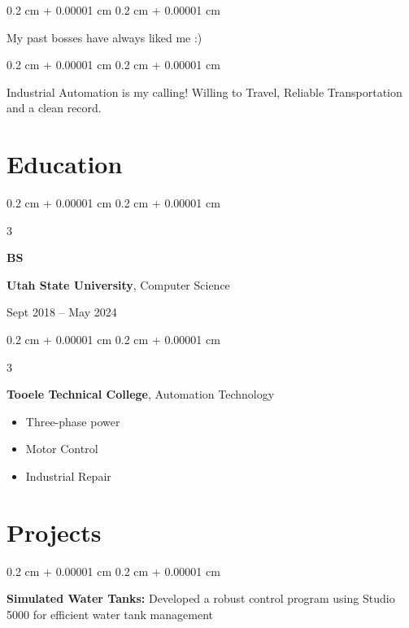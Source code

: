 \documentclass[10pt, letterpaper]{article}
\newenvironment{highlights}{
    \begin{itemize}[
        topsep=0.10 cm,
        parsep=0.10 cm,
        partopsep=0pt,
        itemsep=0pt,
        leftmargin=0.4 cm + 10pt
    ]
}{
    \end{itemize}
} %
\newenvironment{onecolentry}{
    \begin{adjustwidth}{
        0.2 cm + 0.00001 cm
    }{
        0.2 cm + 0.00001 cm
    }
}{
    \end{adjustwidth}
} %
\newenvironment{threecolentry}[3][]{
    \onecolentry
    \def\thirdColumn{#3}
    \setcolumnwidth{1 cm, \fill, 4.5 cm}
    \begin{paracol}{3}
    {\raggedright #2} \switchcolumn
}{
    \switchcolumn \raggedleft \thirdColumn
    \end{paracol}
    \endonecolentry
} %
\begin{document}
        \begin{onecolentry}
            My past bosses have always liked me :)
        \end{onecolentry}

        \vspace{0.2 cm}

        \begin{onecolentry}
            Industrial Automation is my calling! Willing to Travel, Reliable Transportation and a clean record.
        \end{onecolentry}


    
    \section{Education}



        
        \begin{threecolentry}{\textbf{BS}}{
            Sept 2018 – May 2024
        }
            \textbf{Utah State University}, Computer Science
        \end{threecolentry}

        \vspace{0.2 cm}

        \begin{threecolentry}{\textbf{}}{
            
        }
            \textbf{Tooele Technical College}, Automation Technology
            \begin{highlights}
                \item Three-phase power
                \item Motor Control
                \item Industrial Repair
            \end{highlights}
        \end{threecolentry}


    
    \section{Projects}



        
        \begin{onecolentry}
            \textbf{Simulated Water Tanks:} Developed a robust control program using Studio 5000 for efficient water tank management
        \end{onecolentry}
\end{document}
